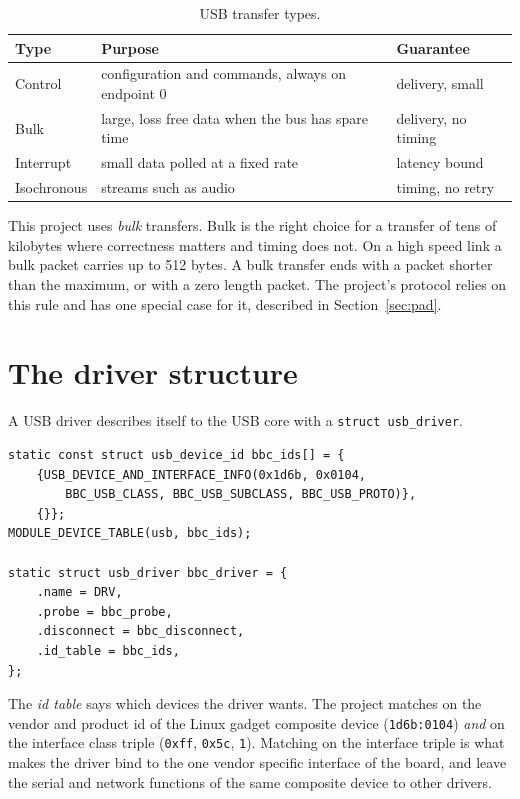 \documentclass[11pt,a4paper,oneside]{report}
\newcommand{\code}[1]{\texttt{\small #1}}
\begin{document}
\begin{table}[ht]
\centering
\begin{tabularx}{\textwidth}{lXl}
\toprule
Type & Purpose & Guarantee \\
\midrule
Control & configuration and commands, always on endpoint 0 & delivery, small \\
Bulk & large, loss free data when the bus has spare time & delivery, no timing \\
Interrupt & small data polled at a fixed rate & latency bound \\
Isochronous & streams such as audio & timing, no retry \\
\bottomrule
\end{tabularx}
\caption{USB transfer types.}
\end{table}

This project uses \emph{bulk} transfers. Bulk is the right choice for a transfer of tens of kilobytes where correctness matters and timing does not. On a high speed link a bulk packet carries up to 512 bytes. A bulk transfer ends with a packet shorter than the maximum, or with a zero length packet. The project's protocol relies on this rule and has one special case for it, described in Section~\ref{sec:pad}.

\section{The driver structure}

A USB driver describes itself to the USB core with a \code{struct usb\_driver}.

\begin{lstlisting}
static const struct usb_device_id bbc_ids[] = {
	{USB_DEVICE_AND_INTERFACE_INFO(0x1d6b, 0x0104,
		BBC_USB_CLASS, BBC_USB_SUBCLASS, BBC_USB_PROTO)},
	{}};
MODULE_DEVICE_TABLE(usb, bbc_ids);

static struct usb_driver bbc_driver = {
	.name = DRV,
	.probe = bbc_probe,
	.disconnect = bbc_disconnect,
	.id_table = bbc_ids,
};
\end{lstlisting}

The \emph{id table} says which devices the driver wants. The project matches on the vendor and product id of the Linux gadget composite device (\code{1d6b:0104}) \emph{and} on the interface class triple (\code{0xff}, \code{0x5c}, \code{1}). Matching on the interface triple is what makes the driver bind to the one vendor specific interface of the board, and leave the serial and network functions of the same composite device to other drivers.
\end{document}
